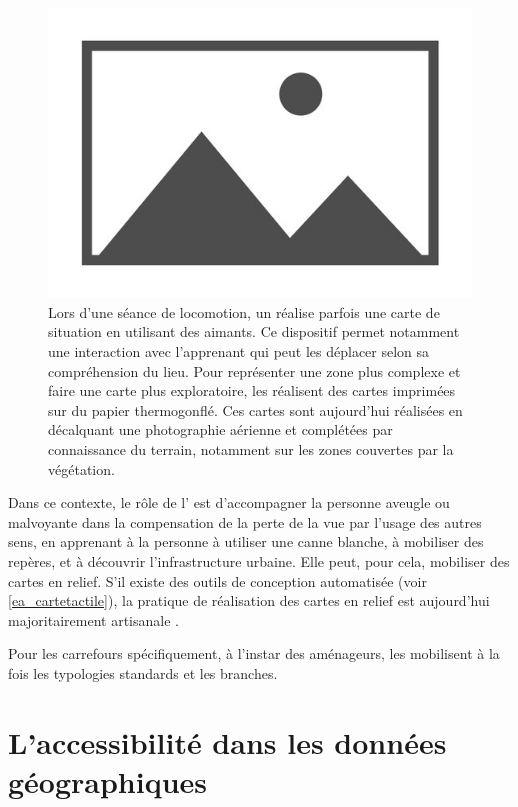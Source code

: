 \begin{figure}
    \centering
    \includegraphics{images/placeholder.jpg}
    \caption{Lors d'une séance de locomotion, un \ipa{} réalise parfois une carte de situation en utilisant des aimants. Ce dispositif permet notamment une interaction avec l'apprenant qui peut les déplacer selon sa compréhension du lieu. Pour représenter une zone plus complexe et faire une carte plus exploratoire, les \ipas{} réalisent des cartes imprimées sur du papier thermogonflé. Ces cartes sont aujourd'hui réalisées en décalquant une photographie aérienne et complétées par connaissance du terrain, notamment sur les zones couvertes par la végétation.}
    \label{fig:il_carte}
\end{figure}

Dans ce contexte, le rôle de l'\ipa{} est d'accompagner la personne aveugle ou malvoyante dans la compensation de la perte de la vue par l'usage des autres sens, en apprenant à la personne à utiliser une canne blanche, à mobiliser des repères, et à découvrir l'infrastructure urbaine. Elle peut, pour cela, mobiliser des cartes en relief. S'il existe des outils de conception automatisée (voir \ref{ea_cartetactile}), la pratique de réalisation des cartes en relief est aujourd'hui majoritairement artisanale .

Pour les carrefours spécifiquement, à l'instar des aménageurs, les \ipas{} mobilisent à la fois les typologies standards et les branches. \todo{}

\section{L'accessibilité dans les données géographiques}

